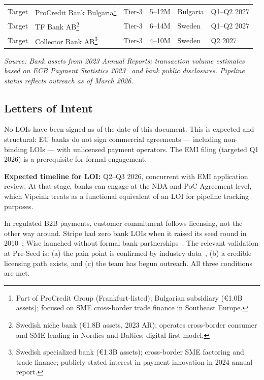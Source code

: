 \documentclass[11pt,a4paper]{article}
\newcommand{\tablesource}[1]{%
\par\vspace{3pt}%
{\footnotesize\color{gray!80}\textit{Source: #1}}%
\par\vspace{2pt}%
}
\begin{document}
\begin{table}[htbp]
\begin{tabularx}{\linewidth}{@{}lp{3cm}lrll@{}}
Target & ProCredit Bank Bulgaria\footnote{Part of ProCredit Group (Frankfurt-listed); Bulgarian subsidiary (\euro 1.0B assets); focused on SME cross-border trade finance in Southeast Europe.} & Tier-3 & 5--12M & Bulgaria & Q1--Q2 2027 \\
Target & TF Bank AB\footnote{Swedish niche bank (\euro 1.8B assets, 2023 AR); operates cross-border consumer and SME lending in Nordics and Baltics; digital-first model.} & Tier-3 & 6--14M & Sweden & Q1--Q2 2027 \\
Target & Collector Bank AB\footnote{Swedish specialized bank (\euro 1.3B assets); cross-border SME factoring and trade finance; publicly stated interest in payment innovation in 2024 annual report.} & Tier-3 & 4--10M & Sweden & Q2 2027 \\
\bottomrule
\end{tabularx}
\tablesource{Bank assets from 2023 Annual Reports; transaction volume estimates based on ECB Payment Statistics 2023~\cite{ecb_payments} and bank public disclosures. Pipeline status reflects outreach as of March 2026.}
\end{table}

\subsection*{Letters of Intent}

No LOIs have been signed as of the date of this document. This is expected and structural: EU banks do not sign commercial agreements --- including non-binding LOIs --- with unlicensed payment operators. The EMI filing (targeted Q1 2026) is a prerequisite for formal engagement.

\textbf{Expected timeline for LOI:} Q2--Q3 2026, concurrent with EMI application review. At that stage, banks can engage at the NDA and PoC Agreement level, which Vipeink treats as a functional equivalent of an LOI for pipeline tracking purposes.

\begin{tcolorbox}[insightbox, title={Why No LOI Is Normal at This Stage}]
In regulated B2B payments, customer commitment follows licensing, not the other way around. Stripe had zero bank LOIs when it raised its seed round in 2010~\cite{stripe_s1}; Wise launched without formal bank partnerships~\cite{wise_ar}. The relevant validation at Pre-Seed is: (a) the pain point is confirmed by industry data~\cite{mckinsey_2024}, (b) a credible licensing path exists, and (c) the team has begun outreach. All three conditions are met.
\end{tcolorbox}
\end{document}
